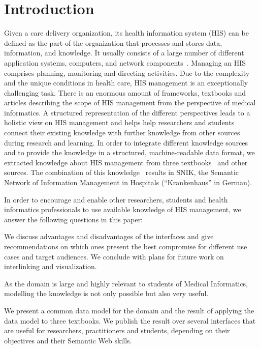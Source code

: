 \documentclass[sw]{iosart2x}
\renewcommand{\citep}{\cite}%
\begin{document}
\section{Introduction}
Given a care delivery organization, its health information system (HIS) can be defined as the part of the organization that processes and stores data, information, and knowledge.
It usually consists of a large number of different application systems, computers, and network components~\citep{bb}.
Managing an HIS comprises planning, monitoring and directing activities.
Due to the complexity and the unique conditions in health care, HIS management is an exceptionally challenging task.
There is an enormous amount of frameworks, textbooks and articles describing the scope of HIS management from the perspective of medical informatics.
A structured representation of the different perspectives leads to a holistic view on HIS management and helps help researchers and students connect their existing knowledge with further knowledge from other sources during research and learning.
In order to integrate different knowledge sources and to provide the knowledge in a structured, machine-readable data format, we extracted knowledge about HIS management from three textbooks~\citep{bb,ob,he} and other sources.
The combination of this knowledge~\citep{einsemantischesnetz,domaene,approachtosupport} results in SNIK, the Semantic Network of Information Management in Hospitals (“Krankenhaus” in German).

In order to encourage and enable other researchers, students and health informatics professionals to use available knowledge of HIS management, we answer the following questions in this paper:

We discuss advantages and disadvantages of the interfaces and give recommendations on which ones present the best compromise for different use cases and target audiences.
We conclude with plans for future work on interlinking and visualization.

As the domain is large and highly relevant to students of Medical Informatics, modelling the knowledge is not only possible but also very useful.

We present a common data model for the domain and the result of applying the data model to three textbooks.
We publish the result over several interfaces that are useful for researchers, practitioners and students, depending on their objectives and their Semantic Web skills.
\end{document}
